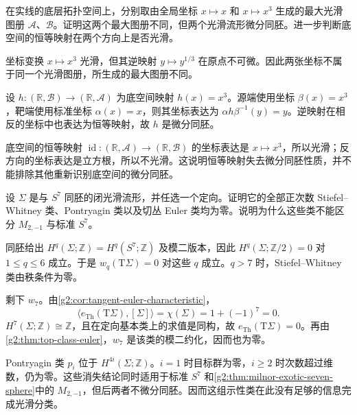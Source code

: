 \begin{exercise}\label{g2:ex:atlas-change-not-exotic}
	在实线的底层拓扑空间上，分别取由全局坐标 \(x\mapsto x\) 和 \(x\mapsto x^3\) 生成的最大光滑图册 \(\mathcal A\)、\(\mathcal B\)。证明这两个最大图册不同，但两个光滑流形微分同胚。进一步判断底空间的恒等映射在两个方向上是否光滑。
\end{exercise}
\begin{solution}
	坐标变换 \(x\mapsto x^3\) 光滑，但其逆映射 \(y\mapsto y^{1/3}\) 在原点不可微。因此两张坐标不属于同一个光滑图册，所生成的最大图册不同。

	设 \(h\colon(\mathbb R,\mathcal B)\rightarrow(\mathbb R,\mathcal A)\) 为底空间映射 \(h(x)=x^3\)。源端使用坐标 \(\beta(x)=x^3\)，靶端使用标准坐标 \(\alpha(x)=x\)，则其坐标表达为 \(\alpha h\beta^{-1}(y)=y\)。逆映射在相反的坐标中也表达为恒等映射，故 \(h\) 是微分同胚。

	底空间的恒等映射 \(\operatorname{id}\colon(\mathbb R,\mathcal A)\rightarrow(\mathbb R,\mathcal B)\) 的坐标表达是 \(x\mapsto x^3\)，所以光滑；反方向的坐标表达是立方根，所以不光滑。这说明恒等映射失去微分同胚性质，并不能排除其他重新识别底空间的微分同胚。
\end{solution}

\begin{exercise}\label{g2:ex:homotopy-seven-sphere-classes}
	设 \(\Sigma\) 是与 \(S^7\) 同胚的闭光滑流形，并任选一个定向。证明它的全部正次数 Stiefel--Whitney 类、Pontryagin 类以及切丛 Euler 类均为零。说明为什么这些类不能区分 \(M_{2,-1}\) 与标准 \(S^7\)。
\end{exercise}
\begin{solution}
	同胚给出 \(H^q(\Sigma;\mathbb Z)=H^q(S^7;\mathbb Z)\) 及模二版本，因此 \(H^q(\Sigma;\mathbb Z/2)=0\) 对 \(1\le q\le6\) 成立。于是 \(w_q(\mathrm T\Sigma)=0\) 对这些 \(q\) 成立。\(q>7\) 时，Stiefel--Whitney 类由秩条件为零。

	剩下 \(w_7\)。由\cref{g2:cor:tangent-euler-characteristic}，
	\[
		\langle e_{\mathrm{Th}}(\mathrm T\Sigma),[\Sigma]\rangle
		=\chi(\Sigma)=1+(-1)^7=0.
	\]
	\(H^7(\Sigma;\mathbb Z)\cong\mathbb Z\)，且在定向基本类上的求值是同构，故 \(e_{\mathrm{Th}}(\mathrm T\Sigma)=0\)。再由\cref{g2:thm:top-class-euler}，\(w_7\) 是该类的模二约化，因而也为零。

	Pontryagin 类 \(p_i\) 位于 \(H^{4i}(\Sigma;\mathbb Z)\)。\(i=1\) 时目标群为零，\(i\ge2\) 时次数超过维数，仍为零。这些消失结论同时适用于标准 \(S^7\) 和\cref{g2:thm:milnor-exotic-seven-sphere}中的 \(M_{2,-1}\)，但后两者不微分同胚。因而这组示性类在此没有足够的信息完成光滑分类。
\end{solution}

